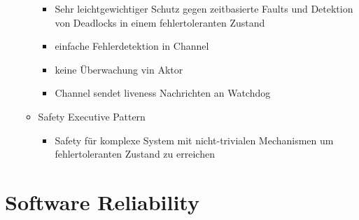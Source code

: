\documentclass[paper=a4, fontsize=11pt]{scrartcl} %
\numberwithin{equation}{section} %
\numberwithin{figure}{section} %
\numberwithin{table}{section} %
\begin{document}
\begin{itemize}
\begin{itemize}
\begin{itemize}
      \item Sehr leichtgewichtiger Schutz gegen zeitbasierte Faults und Detektion von Deadlocks in einem fehlertoleranten Zustand
      \item einfache Fehlerdetektion in Channel
      \item keine Überwachung vin Aktor
      \item Channel sendet liveness Nachrichten an Watchdog
    \end{itemize}
    \item Safety Executive Pattern
    \begin{itemize}
      \item Safety für komplexe System mit nicht-trivialen Mechanismen um fehlertoleranten Zustand zu erreichen
    \end{itemize}
  \end{itemize}
\end{itemize}

\section{Software Reliability}
\end{document}
